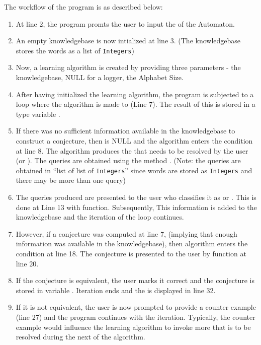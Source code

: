The workflow of the program is as described below:

\begin{enumerate}
	\item At line 2, the program promts the user to input the \alphsize of the Automaton.
	\item An empty knowledgebase is now intialized at line 3. (The knowledgebase stores the words as a list of \texttt{Integers})
	\item Now, a learning algorithm is created by providing three parameters - the knowledgebase, NULL for a logger, the Alphabet Size.
	\item After having initialized the learning algorithm, the program is subjected to a loop where the algorithm is made to \advanced (Line 7). The result of this is stored in a \conjecture type variable \cj.
	
	\item If there was no sufficient information available in the knowledgebase to construct a conjecture, then \cj is NULL and the algorithm enters the condition at line 8. The algorithm produces the \memque that needs to be resolved by the user (or \teacher). The queries are obtained using the method \getqueries. (Note: the queries are obtained in ``list of list of \texttt{Integers}'' since words are stored as \texttt{Integers} and there may be more than one query)
	
	\item The queries produced are presented to the user who classifies it as \accepted or \rejected. This is done at Line 13 with \answer function. Subsequently, This information is added to the knowledgebase and the iteration of the loop continues.

	\item However, if a conjecture was computed at line 7, (implying that enough information was available in the knowledgebase), then algorithm enters the condition at line 18. The conjecture is presented to the user by \checkeq function at line 20.
	
	\item If the conjecture is equivalent, the user marks it correct and the conjecture is stored in variable \result. Iteration ends and the \result is displayed in line 32.
	
	\item If it is not equivalent, the user is now prompted to provide a counter example (line 27) and the program continues with the iteration. Typically, the counter example would influence the learning algorithm to invoke more \memque that is to be resolved during the next \advanced of the algorithm.
\end{enumerate}


